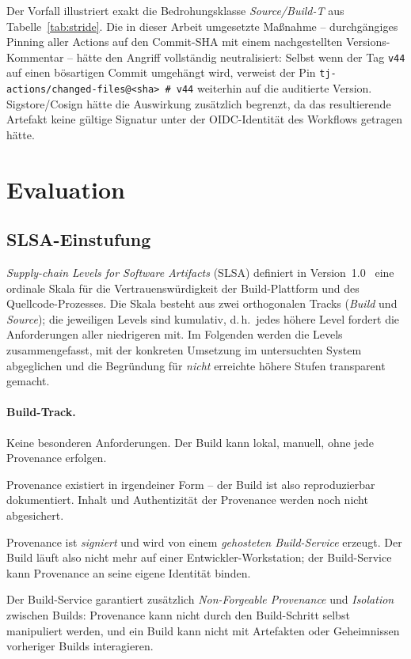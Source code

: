\documentclass[12pt, a4paper]{scrartcl}
\begin{document}
Der Vorfall illustriert exakt die Bedrohungsklasse \emph{Source/Build-T}
aus Tabelle~\ref{tab:stride}. Die in dieser Arbeit umgesetzte Maßnahme --
durchgängiges Pinning aller Actions auf den Commit-SHA mit einem
nachgestellten Versions-Kommentar -- hätte den Angriff vollständig
neutralisiert: Selbst wenn der Tag \texttt{v44} auf einen bösartigen
Commit umgehängt wird, verweist der Pin
\texttt{tj-actions/changed-files@<sha>~\#~v44} weiterhin auf die
auditierte Version. Sigstore/Cosign hätte die Auswirkung zusätzlich
begrenzt, da das resultierende Artefakt keine gültige Signatur unter
der OIDC-Identität des Workflows getragen hätte.

\section{Evaluation}\label{sec:evaluation}

\subsection{SLSA-Einstufung}\label{sec:slsa}
\emph{Supply-chain Levels for Software Artifacts} (SLSA) definiert in
Version~1.0~\cite{slsa} eine ordinale Skala für die Vertrauenswürdigkeit
der Build-Plattform und des Quellcode-Prozesses. Die Skala besteht aus
zwei orthogonalen Tracks (\emph{Build} und \emph{Source}); die jeweiligen
Levels sind kumulativ, d.\,h.\ jedes höhere Level fordert die
Anforderungen aller niedrigeren mit. Im Folgenden werden die Levels
zusammengefasst, mit der konkreten Umsetzung im untersuchten System
abgeglichen und die Begründung für \emph{nicht} erreichte höhere Stufen
transparent gemacht.

\paragraph{Build-Track.}
\begin{description}[leftmargin=1.4em,style=nextline]
  \item[L0] Keine besonderen Anforderungen. Der Build kann lokal,
        manuell, ohne jede Provenance erfolgen.
  \item[L1] Provenance existiert in irgendeiner Form -- der Build ist
        also reproduzierbar dokumentiert. Inhalt und Authentizität der
        Provenance werden noch nicht abgesichert.
  \item[L2] Provenance ist \emph{signiert} und wird von einem
        \emph{gehosteten Build-Service} erzeugt. Der Build läuft also
        nicht mehr auf einer Entwickler-Workstation; der
        Build-Service kann Provenance an seine eigene Identität
        binden.
  \item[L3] Der Build-Service garantiert zusätzlich
        \emph{Non-Forgeable Provenance} und \emph{Isolation} zwischen
        Builds: Provenance kann nicht durch den Build-Schritt selbst
        manipuliert werden, und ein Build kann nicht mit Artefakten
        oder Geheimnissen vorheriger Builds interagieren.
\end{description}
\end{document}
